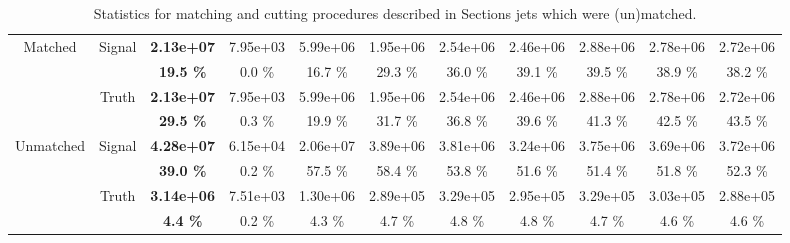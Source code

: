 \begin{appendices}
\begin{landscape}
\begin{table}
\begin{tabular}{|c|c|>{\bfseries}c|c|c|c|c|c|c|c|c|}
    \hline                                                              
    \multirow{4}{*}{Matched}        & \multirow{2}{*}{Signal}   & 2.13e+07 & 7.95e+03 & 5.99e+06 & 1.95e+06 & 2.54e+06 & 2.46e+06 & 2.88e+06 & 2.78e+06 & 2.72e+06 \\
                                    &                           & 19.5 \%  & 0.0 \%   & 16.7 \%  & 29.3 \%  & 36.0 \%  & 39.1 \%  & 39.5 \%  & 38.9 \%  & 38.2 \%  \\
    \cline{2-11}                                                                                    
                                    & \multirow{2}{*}{Truth}    & 2.13e+07 & 7.95e+03 & 5.99e+06 & 1.95e+06 & 2.54e+06 & 2.46e+06 & 2.88e+06 & 2.78e+06 & 2.72e+06 \\
                                    &                           & 29.5 \%  & 0.3 \%   & 19.9 \%  & 31.7 \%  & 36.8 \%  & 39.6 \%  & 41.3 \%  & 42.5 \%  & 43.5 \%  \\
    \hline                                                              
    \hline                                                              
    \multirow{4}{*}{Unmatched}      & \multirow{2}{*}{Signal}   & 4.28e+07 & 6.15e+04 & 2.06e+07 & 3.89e+06 & 3.81e+06 & 3.24e+06 & 3.75e+06 & 3.69e+06 & 3.72e+06 \\
                                    &                           & 39.0 \%  & 0.2 \%   & 57.5 \%  & 58.4 \%  & 53.8 \%  & 51.6 \%  & 51.4 \%  & 51.8 \%  & 52.3 \%  \\
    \cline{2-11}                                                                                    
                                    & \multirow{2}{*}{Truth}    & 3.14e+06 & 7.51e+03 & 1.30e+06 & 2.89e+05 & 3.29e+05 & 2.95e+05 & 3.29e+05 & 3.03e+05 & 2.88e+05 \\
                                    &                           & 4.4 \%   & 0.2 \%   & 4.3 \%   & 4.7 \%   & 4.8 \%   & 4.8 \%   & 4.7 \%   & 4.6 \%   & 4.6 \%   \\
    \hline
  \end{tabular}
  \caption{Statistics for matching and cutting procedures described in Sections
  jets which were (un)matched.}
  \label{tab:CutAndMatchingEfficiency}
\end{table} 
\end{landscape}


\end{appendices}
